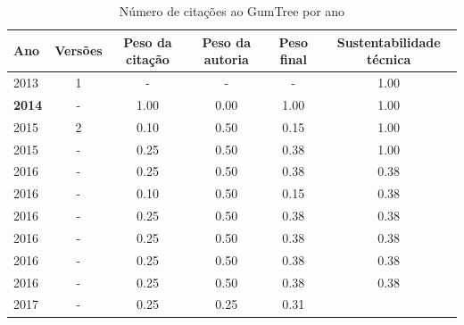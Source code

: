 \begin{table}[H]
\caption{Número de citações ao GumTree por ano}
\centering
\begin{tabular}{| l | c | c | c | c | c |}
  \hline
  Ano & Versões & Peso da citação & Peso da autoria & Peso final & Sustentabilidade técnica \\
  \hline
        2013 & 1 & - & - & -
        &
          {\color{blue} 1.00}
        \\
\hline
            {\bf 2014}
          &
          -
          &
          1.00
          &
          0.00
          &
          1.00
          &
            {\color{blue} 1.00}
          \\
\hline
            2015
          &
          2
          &
          0.10
          &
          0.50
          &
          0.15
          &
            {\color{blue} 1.00}
          \\
            2015
          &
          -
          &
          0.25
          &
          0.50
          &
          0.38
          &
            {\color{blue} 1.00}
          \\
\hline
            2016
          &
          -
          &
          0.25
          &
          0.50
          &
          0.38
          &
            {\color{red} 0.38}
          \\
            2016
          &
          -
          &
          0.10
          &
          0.50
          &
          0.15
          &
            {\color{red} 0.38}
          \\
            2016
          &
          -
          &
          0.25
          &
          0.50
          &
          0.38
          &
            {\color{red} 0.38}
          \\
            2016
          &
          -
          &
          0.25
          &
          0.50
          &
          0.38
          &
            {\color{red} 0.38}
          \\
            2016
          &
          -
          &
          0.25
          &
          0.50
          &
          0.38
          &
            {\color{red} 0.38}
          \\
            2016
          &
          -
          &
          0.25
          &
          0.50
          &
          0.38
          &
            {\color{red} 0.38}
          \\
\hline
            2017
          &
          -
          &
          0.25
          &
          0.25
          &
          0.31
          &

\end{tabular}
\end{table}
